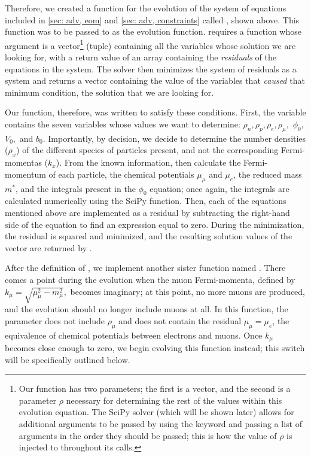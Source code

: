 Therefore, we created a function for the evolution of the system of equations included in \autoref{sec: adv, eom} and \autoref{sec: adv, constraints} called , shown above. This function was to be passed to  as the evolution function.  requires a function whose argument is a vector\footnote{Our function has two parameters; the first is a vector, and the second is a parameter $\rho$ necessary for determining the rest of the values within this evolution equation. The SciPy solver (which will be shown later) allows for additional arguments to be passed by using the  keyword and passing a list of arguments in the order they should be passed; this is how the value of $\rho$ is injected to  throughout its calls.} (tuple) containing all the variables whose solution we are looking for, with a return value of an array containing the \textit{residuals} of the equations in the system. The solver then minimizes the system of residuals as a system and returns a vector containing the value of the variables that \textit{caused} that minimum condition, the solution that we are looking for.

Our  function, therefore, was written to satisfy these conditions. First, the variable  contains the seven variables whose values we want to determine: $\rho_n, \rho_p, \rho_e, \rho_\mu,$ $\phi_0,$  $V_0,$ and $b_0$. Importantly, by decision, we decide to determine the number densities ($\rho_x$) of the different species of particles present, and not the corresponding Fermi-momentas ($k_x$). From the known information, then calculate the Fermi-momentum of each particle, the chemical potentials $\mu_\mu$ and $\mu_e$, the reduced mass $m^*$, and the integrals present in the $\phi_0$ equation; once again, the integrals are calculated numerically using the SciPy  function. Then, each of the equations mentioned above are implemented as a residual by subtracting the right-hand side of the equation to find an expression equal to zero. During the minimization, the residual is squared and minimized, and the resulting solution values of the vector are returned by .

After the definition of , we implement another sister function named  . There comes a point during the evolution when the muon Fermi-momenta, defined by $k_\mu = \sqrt{\mu_\mu^2 - m_\mu^2},$ becomes imaginary; at this point, no more muons are produced, and the evolution should no longer include muons at all. In this function, the parameter  does not include $\rho_\mu$ and does not contain the residual $\mu_\mu = \mu_e$, the equivalence of chemical potentials between electrons and muons. Once $k_\mu$ becomes close enough to zero, we begin evolving this function instead; this switch will be specifically outlined below.

